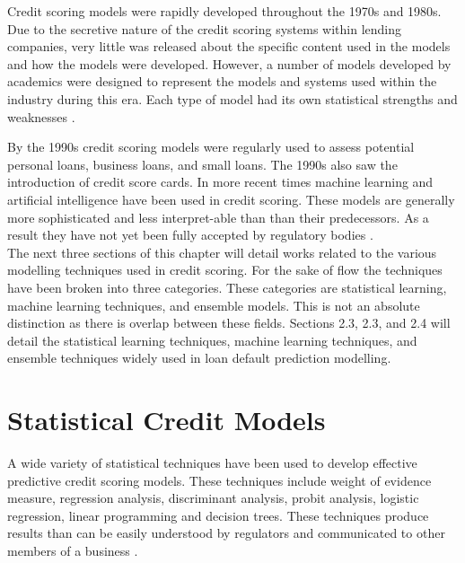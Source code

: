 Credit scoring models were rapidly developed throughout the 1970s and 1980s. Due to the secretive nature of the credit scoring systems within lending companies, very little was released about the specific content used in the models and how the models were developed.   However, a number of models developed by academics were designed to represent the models and systems used within the industry during this era. Each type of model had its own statistical strengths and weaknesses \parencite{CreditScoringReadings}. \newpage

By the 1990s credit scoring models were regularly used to assess potential personal loans, business loans, and small loans. The 1990s also saw the introduction of credit score cards. In more recent times machine learning and artificial intelligence have been used in credit scoring. These models are generally more sophisticated and less interpret-able than than their predecessors. As a result they have not yet been fully accepted by regulatory bodies \parencite{CreditScoringTechniquesOverview}. \\

The next three sections of this chapter will detail works related to the various modelling techniques used in credit scoring. For the sake of flow the techniques have been broken into three categories. These categories are statistical learning, machine learning techniques, and ensemble models. This is not an absolute distinction as there is overlap between these fields. Sections 2.3, 2.3, and 2.4 will detail the statistical learning techniques, machine learning techniques, and ensemble techniques widely used in loan default prediction modelling. 


\section{Statistical Credit Models}

A wide variety of statistical techniques have been used to develop effective predictive credit scoring models. These techniques include weight of evidence measure, regression analysis, discriminant analysis, probit analysis, logistic regression, linear programming and decision trees. These techniques produce results than can be easily understood by regulators and communicated to other members of a business \parencite{CreditScoringTechniquesLitReview}. 


